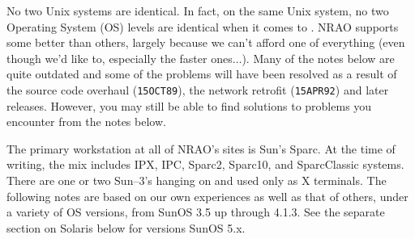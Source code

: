 %
%
%
%
\medskip



No two Unix systems are identical.  In fact, on the same Unix system, no
two Operating System (OS) levels are identical when it comes to \AIPS.
NRAO supports some better than others, largely because we can't afford one
of everything (even though we'd like to, especially the faster
ones$\dots$).  Many of the notes below are quite outdated and some of the
problems will have been resolved as a result of the source code overhaul
({\tt 15OCT89}), the network retrofit ({\tt 15APR92}) and later releases.
However, you may still be able to find solutions to problems you encounter
from the notes below.\medskip


The primary workstation at all of NRAO's sites is Sun's Sparc.  At the
time of writing, the mix includes IPX, IPC, Sparc2, Sparc10, and
SparcClassic systems.  There are one or two Sun--3's hanging on and used
only as X terminals.  The following notes are based on our own experiences
as well as that of others, under a variety of OS versions, from SunOS 3.5
up through 4.1.3.  See the separate section on Solaris below for versions
SunOS 5.x.

